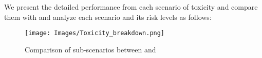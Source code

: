 We present the detailed performance from each scenario of toxicity and compare them with \gpt and analyze each scenario and its risk levels as follows:
\begin{figure*}[h]
    \centering
    \texttt{[image: Images/Toxicity\_breakdown.png]}
    \vspace{-0.5in}
    \caption{Comparison of sub-scenarios between \llm and \gpt}
\label{fig:toxicity-radar}
\end{figure*} 
